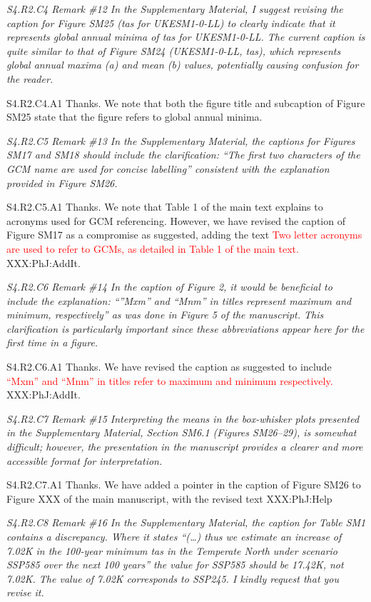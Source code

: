 \documentclass[a4paper,10pt]{article}
\newcommand{\ed}[1]{\textcolor{red}{#1}}
\begin{document}
	\emph{S4.R2.C4 Remark \#12 In the Supplementary Material, I suggest revising the caption for Figure SM25 (tas for UKESM1-0-LL) to clearly indicate that it represents global annual minima of tas for UKESM1-0-LL. The current caption is quite similar to that of Figure SM24 (UKESM1-0-LL, tas), which represents global annual maxima (a) and mean (b) values, potentially causing confusion for the reader.}

	S4.R2.C4.A1 Thanks. We note that both the figure title and subcaption of Figure SM25 state that the figure refers to global annual minima.

	\emph{S4.R2.C5 Remark \#13 In the Supplementary Material, the captions for Figures SM17 and SM18 should include the clarification: “The first two characters of the GCM name are used for concise labelling” consistent with the explanation provided in Figure SM26.}

	S4.R2.C5.A1 Thanks. We note that Table 1 of the main text explains to acronyms used for GCM referencing. However, we have revised the caption of Figure SM17 as a compromise as suggested, adding the text \ed{Two letter acronyms are used to refer to GCMs, as detailed in Table 1 of the main text.} XXX:PhJ:AddIt.

	\emph{S4.R2.C6 Remark \#14 In the caption of Figure 2, it would be beneficial to include the explanation: “”Mxm” and “Mnm” in titles represent maximum and minimum, respectively” as was done in Figure 5 of the manuscript. This clarification is particularly important since these abbreviations appear here for the first time in a figure.}

	S4.R2.C6.A1 Thanks. We have revised the caption as suggested to include \ed{``Mxm'' and ``Mnm'' in titles refer to maximum and minimum respectively.} XXX:PhJ:AddIt.

	\emph{S4.R2.C7 Remark \#15 Interpreting the means in the box-whisker plots presented in the Supplementary Material, Section SM6.1 (Figures SM26–29), is somewhat difficult; however, the presentation in the manuscript provides a clearer and more accessible format for interpretation.}

	S4.R2.C7.A1 Thanks. We have added a pointer in the caption of Figure SM26 to Figure XXX of the main manuscript, with the revised text XXX:PhJ:Help

	\emph{S4.R2.C8 Remark \#16 In the Supplementary Material, the caption for Table SM1 contains a discrepancy. Where it states “(…) thus we estimate an increase of 7.02K in the 100-year minimum tas in the Temperate North under scenario SSP585 over the next 100 years” the value for SSP585 should be 17.42K, not 7.02K. The value of 7.02K corresponds to SSP245. I kindly request that you revise it.}
\end{document}
